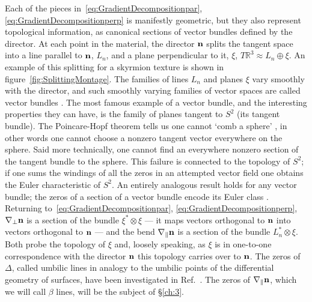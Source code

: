 Each of the pieces in~\eqref{eq:GradientDecompositionpar}, \eqref{eq:GradientDecompositionperp} is manifestly geometric, but they also represent topological information, as canonical sections of vector bundles defined by the director. At each point in the material, the director $\bf n$ splits the tangent space into a line parallel to $\bf n$, $L_n$, and a plane perpendicular to it, $\xi$, $T \mathbb{R}^3 \approx L_n \oplus \xi$. An example of this splitting for a skyrmion texture is shown in figure~\ref{fig:SplittingMontage}. The families of lines $L_n$ and planes $\xi$ vary smoothly with the director, and such smoothly varying families of vector spaces are called vector bundles \citep{TuBook,MilnorStasheffBook}. The most famous example of a vector bundle, and the interesting properties they can have, is the family of planes tangent to $S^2$ (its tangent bundle). The Poincare-Hopf theorem tells us one cannot `comb a sphere' \citep{Milnor1997}, in other words one cannot choose a nonzero tangent vector everywhere on the sphere. Said more technically, one cannot find an everywhere nonzero section of the tangent bundle to the sphere. This failure is connected to the topology of $S^2$; if one sums the windings of all the zeros in an attempted vector field one obtains the Euler characteristic of $S^2$. An entirely analogous result holds for any vector bundle; the zeros of a section of a vector bundle encode its Euler class \citep{BottTuBook, MilnorStasheffBook}. Returning to~\eqref{eq:GradientDecompositionpar}, \eqref{eq:GradientDecompositionperp}, $\nabla_\perp \bf n$ is a section of the bundle $\xi^* \otimes \xi$ --- it maps vectors orthogonal to $\bf n$ into vectors orthogonal to $\bf n$ --- and the bend $\nabla_\parallel \bf n$ is a section of the bundle $L_n^* \otimes \xi$. Both probe the topology of $\xi$ and, loosely speaking, as $\xi$ is in one-to-one correspondence with the director $\bf n$ this topology carries over to $\bf n$. The zeros of $\Delta$, called umbilic lines in analogy to the umbilic points of the differential geometry of surfaces, have been investigated in Ref.~\citep{Machon2016b}. The zeros of $\nabla_{\parallel} \bf n$, which we will call $\beta$ lines, will be the subject of \S\ref{ch:3}.
